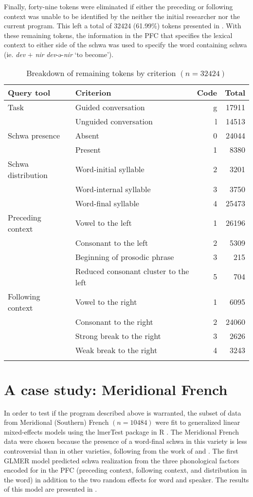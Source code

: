 \documentclass[output=paper,colorlinks,citecolor=brown,
]{langscibook}
\begin{document}
Finally, forty-nine tokens were eliminated if either the preceding or following context was unable to be identified by the neither the initial researcher nor the current program. This left a total of 32424 (61.99\%) tokens presented in . With these remaining tokens, the information in the PFC that specifies the lexical context to either side of the schwa was used to specify the word containing schwa (ie. \textit{dev} $+$ \textit{nir} \textit{dev}-ə-\textit{nir} `to become').

\begin{table}
\caption{Breakdown of remaining tokens by criterion $(n=32424)$}
\label{tab:griffiths:query2}
\begin{tabular}{llrr}  \lsptoprule
\textbf{Query tool} & \textbf{Criterion} & \textbf{Code} & \textbf{Total} \\ \midrule
Task & Guided conversation & g & 17911 \\
 & Unguided conversation & l & 14513 \\ \midrule
Schwa presence & Absent & 0 & 24044 \\
 & Present & 1 & 8380 \\ \midrule
Schwa distribution & Word-initial syllable & 2 & 3201 \\
 & Word-internal syllable & 3 & 3750 \\
 & Word-final syllable & 4 & 25473 \\ \midrule
Preceding context & Vowel to the left & 1 & 26196 \\
 & Consonant to the left & 2 & 5309 \\
 & Beginning of prosodic phrase & 3 & 215 \\
 & Reduced consonant cluster to the left & 5 & 704 \\ \midrule
Following context & Vowel to the right & 1 & 6095 \\
 & Consonant to the right & 2 & 24060 \\
 & Strong break to the right & 3 & 2626 \\
 & Weak break to the right & 4 & 3243 \\  \lspbottomrule
\end{tabular}
\end{table}

\section{A case study: Meridional French}
\label{sec:griffiths:analysis}
In order to test if the program described above is warranted, the subset of data from Meridional (Southern) French $(n=10484)$ were fit to generalized linear mixed-effects models using the lmerTest package in R \citep{kuznetsova}. The Meridional French data were chosen because the presence of a word-final schwa in this variety is less controversial than in other varieties, following from the work of \citet{durand2} and \citet{durand}. The first GLMER model predicted schwa realization from the three phonological factors encoded for in the PFC (preceding context, following context, and distribution in the word) in addition to the two random effects for word and speaker. The results of this model are presented in .
\end{document}
